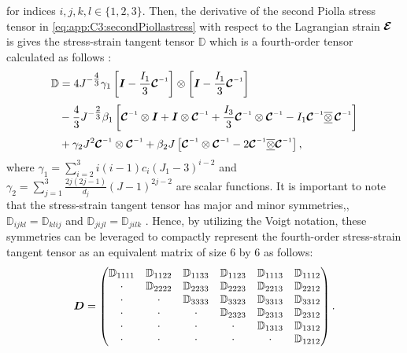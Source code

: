 %
for indices $i,j,k,l \in \{1,2,3\}$. Then, the derivative of the second Piolla stress tensor in \eqref{eq:app:C3:secondPiollastress} with respect to the Lagrangian strain $\boldsymbol{\mathcal{E}}$ is gives the stress-strain tangent tensor $\mathbb{D}$ which is a fourth-order tensor calculated as follows \cite{Renaud2011}:
%
\begin{align}
\mathbb{D} & = 4J^{-\tfrac{4}{3}}\gamma_1 \left[\IB - \frac{I_1}{3}\CT\inv \right] \otimes \left[\IB - \frac{I_1}{3}\CT\inv \right] \notag \\[0.25em]
& - \frac{4}{3}J^{-\tfrac{2}{3}} \beta_1 \left[\ten{C}\inv \otimes \IB + \IB \otimes \ten{C}\inv + \frac{I_3}{3} \ten{C}\inv \otimes \ten{C}\inv - I_1 \ten{C}\inv \overline{\underline{\otimes}} \,\ten{C}\inv \right] \notag \\[0.25em]
& + \gamma_2 J^2 \ten{C}\inv \otimes \ten{C}\inv + \beta_2 J \left[\ten{C}\inv \otimes \ten{C} \inv - 2 \ten{C}\inv \overline{\underline{\otimes}} \ten{C}\inv \right],
\end{align}
%
\newpage
\noindent where $\gamma_1 = \sum_{i=2}^3 i(i-1) {c_i} (J_1 - 3)^{i-2}$ and $\gamma_2 = \sum_{j=1}^3 \frac{2j(2j-1)}{d_j} \left(J - 1\right)^{2j - 2}$ are scalar functions. It is important to note that the stress-strain tangent tensor has major and minor symmetries,\ie, $\mathbb{D}_{ijkl} = \mathbb{D}_{klij}$ and $\mathbb{D}_{jijl} = \mathbb{D}_{jilk}$ \cite{Kim2018,Holzapfel2002}. Hence, by utilizing the Voigt notation, these symmetries can be leveraged to compactly represent the fourth-order stress-strain tangent tensor as an equivalent matrix of size 6 by 6 as follows:
%
\begin{equation}
{\boldsymbol{D}} = \begin{pmatrix}
\mathbb{D}_{1111} & \mathbb{D}_{1122}  & \mathbb{D}_{1133}  & \mathbb{D}_{1123}  & \mathbb{D}_{1113}  & \mathbb{D}_{1112} \\
\cdot & \mathbb{D}_{2222}  & \mathbb{D}_{2233}  & \mathbb{D}_{2223}  & \mathbb{D}_{2213}  & \mathbb{D}_{2212} \\
\cdot & \cdot & \mathbb{D}_{3333}  & \mathbb{D}_{3323}  & \mathbb{D}_{3313}  & \mathbb{D}_{3312} \\
\cdot & \cdot & \cdot  & \mathbb{D}_{2323}  & \mathbb{D}_{2313}  & \mathbb{D}_{2312} \\
\cdot & \cdot & \cdot  & \cdot & \mathbb{D}_{1313}  & \mathbb{D}_{1312} \\
\cdot & \cdot & \cdot  & \cdot  & \cdot  & \mathbb{D}_{1212} 
\end{pmatrix}.
\end{equation}
